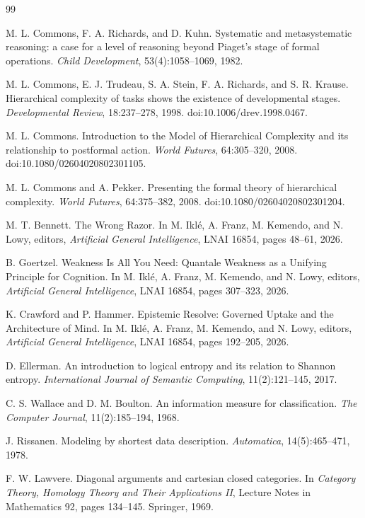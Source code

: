 \documentclass[11pt]{article}
\theoremstyle{remark}
\begin{document}
\begin{thebibliography}{99}

M. L. Commons, F. A. Richards, and D. Kuhn.
Systematic and metasystematic reasoning: a case for a level of reasoning beyond
Piaget's stage of formal operations.
\emph{Child Development}, 53(4):1058--1069, 1982.

M. L. Commons, E. J. Trudeau, S. A. Stein, F. A. Richards, and S. R. Krause.
Hierarchical complexity of tasks shows the existence of developmental stages.
\emph{Developmental Review}, 18:237--278, 1998.
doi:10.1006/drev.1998.0467.

M. L. Commons.
Introduction to the Model of Hierarchical Complexity and its relationship to
postformal action.
\emph{World Futures}, 64:305--320, 2008.
doi:10.1080/02604020802301105.

M. L. Commons and A. Pekker.
Presenting the formal theory of hierarchical complexity.
\emph{World Futures}, 64:375--382, 2008.
doi:10.1080/02604020802301204.

M. T. Bennett.
The Wrong Razor.
In M. Ikl\'e, A. Franz, M. Kemendo, and N. Lowy, editors,
\emph{Artificial General Intelligence}, LNAI 16854, pages 48--61, 2026.

B. Goertzel.
Weakness Is All You Need: Quantale Weakness as a Unifying Principle for
Cognition.
In M. Ikl\'e, A. Franz, M. Kemendo, and N. Lowy, editors,
\emph{Artificial General Intelligence}, LNAI 16854, pages 307--323, 2026.

K. Crawford and P. Hammer.
Epistemic Resolve: Governed Uptake and the Architecture of Mind.
In M. Ikl\'e, A. Franz, M. Kemendo, and N. Lowy, editors,
\emph{Artificial General Intelligence}, LNAI 16854, pages 192--205, 2026.

D. Ellerman.
An introduction to logical entropy and its relation to Shannon entropy.
\emph{International Journal of Semantic Computing}, 11(2):121--145, 2017.

C. S. Wallace and D. M. Boulton.
An information measure for classification.
\emph{The Computer Journal}, 11(2):185--194, 1968.

J. Rissanen.
Modeling by shortest data description.
\emph{Automatica}, 14(5):465--471, 1978.

F. W. Lawvere.
Diagonal arguments and cartesian closed categories.
In \emph{Category Theory, Homology Theory and Their Applications II},
Lecture Notes in Mathematics 92, pages 134--145. Springer, 1969.

\end{thebibliography}
\end{document}
